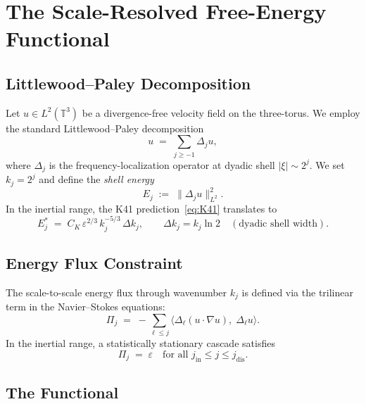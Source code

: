 \documentclass[12pt,a4paper]{article}
\theoremstyle{breakdef}
\theoremstyle{breakplain}
\theoremstyle{breakdef}
\begin{document}
\section{The Scale-Resolved Free-Energy Functional}\label{sec:functional}

\subsection{Littlewood--Paley Decomposition}

Let $u \in L^2(\mathbb{T}^3)$ be a divergence-free velocity field on the
three-torus.  We employ the standard Littlewood--Paley decomposition
\begin{equation}\label{eq:LP}
  u \;=\; \sum_{j \ge -1} \Delta_j u,
\end{equation}
where $\Delta_j$ is the frequency-localization operator at dyadic shell
$|\xi| \sim 2^j$.  We set $k_j = 2^j$ and define the \emph{shell energy}
\begin{equation}\label{eq:Ej}
  E_j \;:=\; \|\Delta_j u\|_{L^2}^2.
\end{equation}
In the inertial range, the K41 prediction~\eqref{eq:K41} translates to
\begin{equation}\label{eq:Ej_star}
  E_j^* \;=\; C_K\, \varepsilon^{2/3}\, k_j^{-5/3} \,\Delta k_j,
  \qquad \Delta k_j = k_j \ln 2 \quad (\text{dyadic shell width}).
\end{equation}

\subsection{Energy Flux Constraint}

The scale-to-scale energy flux through wavenumber $k_j$ is defined via the
trilinear term in the Navier--Stokes equations:
\begin{equation}\label{eq:flux}
  \Pi_j \;=\; -\sum_{\ell \le j}
    \langle \Delta_\ell(u \cdot \nabla u),\; \Delta_\ell u \rangle.
\end{equation}
In the inertial range, a statistically stationary cascade satisfies
\begin{equation}\label{eq:const_flux}
  \Pi_j \;=\; \varepsilon \quad \text{for all } j_{\mathrm{in}} \le j \le j_{\mathrm{dis}}.
\end{equation}

\subsection{The Functional}
\end{document}
